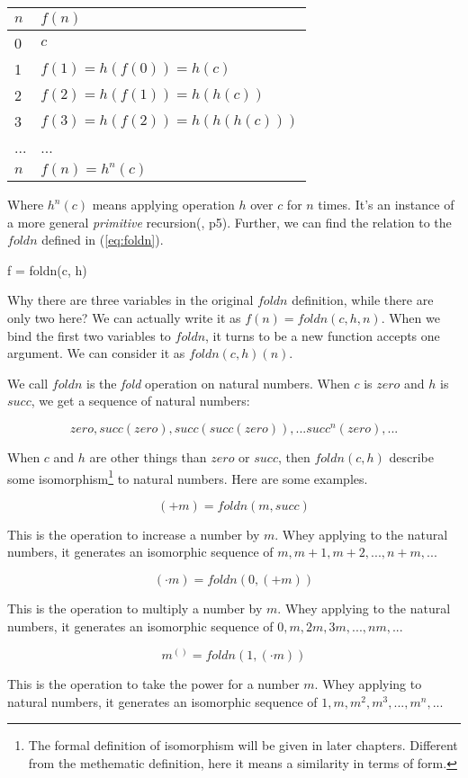 \documentclass[UTF8]{article}
\begin{document}
\begin{tabular}{l|l}
$n$ & $f(n)$ \\
\hline
0 & $c$ \\
1 & $f(1) = h(f(0)) = h(c)$ \\
2 & $f(2) = h(f(1)) = h(h(c))$ \\
3 & $f(3) = h(f(2)) = h(h(h(c)))$ \\
... & ... \\
$n$ & $f(n) = h^n(c)$
\end{tabular}

Where $h^n(c)$ means applying operation $h$ over $c$ for $n$ times. It's an instance of a more general {\em primitive} recursion(\cite{Bird97}, p5). Further, we can find the relation to the $foldn$ defined in (\ref{eq:foldn}).

\be
f = foldn(c, h)
\ee

Why there are three variables in the original $foldn$ definition, while there are only two here? We can actually write it as $f(n) = foldn(c, h, n)$. When we bind the first two variables to $foldn$, it turns to be a new function accepts one argument. We can consider it as $foldn(c, h)(n)$.

We call $foldn$ is the {\em fold} operation on natural numbers. When $c$ is $zero$ and $h$ is $succ$, we get a sequence of natural numbers:

\[
zero, succ(zero), succ(succ(zero)), ... succ^n(zero), ...
\]

When $c$ and $h$ are other things than $zero$ or $succ$, then $foldn(c, h)$ describe some isomorphism\footnote{The formal definition of isomorphism will be given in later chapters. Different from the methematic definition, here it means a similarity in terms of form.} to natural numbers. Here are some examples.

\[
(+ m) = foldn(m, succ)
\]

This is the operation to increase a number by $m$. Whey applying to the natural numbers, it generates an isomorphic sequence of $m, m + 1, m + 2, ..., n + m, ...$

\[
(\cdot m) = foldn(0, (+ m))
\]

This is the operation to multiply a number by $m$. Whey applying to the natural numbers, it generates an isomorphic sequence of $0, m, 2m, 3m, ..., nm, ...$

\[
m^{()} = foldn(1, (\cdot m))
\]

This is the operation to take the power for a number $m$. Whey applying to natural numbers, it generates an isomorphic sequence of $1, m, m^2, m^3, ..., m^n, ...$
\end{document}
